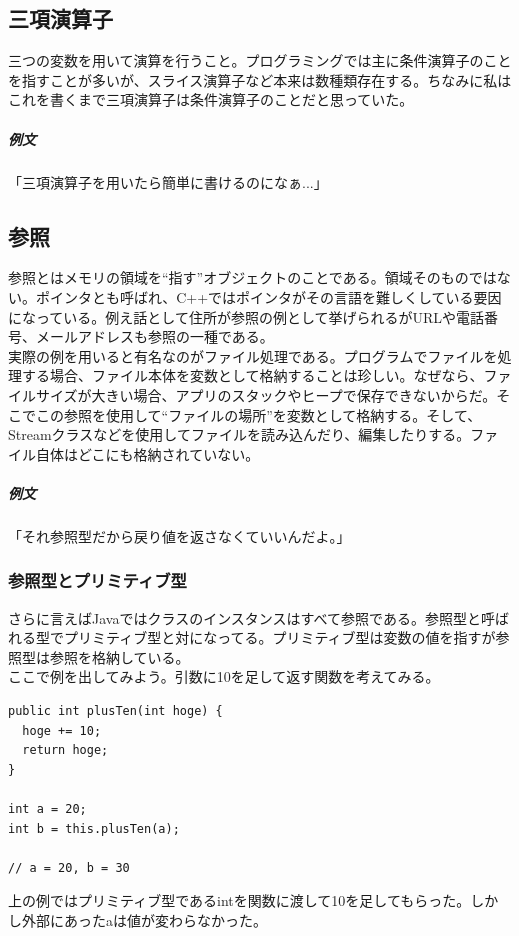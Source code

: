 \documentclass[dvipdfmx,jb5]{jreport}
\begin{document}
\subsection{三項演算子}
三つの変数を用いて演算を行うこと。プログラミングでは主に条件演算子のことを指すことが多いが、スライス演算子など本来は数種類存在する。ちなみに私はこれを書くまで三項演算子は条件演算子のことだと思っていた。

\subparagraph{例文} 「三項演算子を用いたら簡単に書けるのになぁ...」

\subsection{参照}
参照とはメモリの領域を``指す''オブジェクトのことである。領域そのものではない。ポインタとも呼ばれ、C++ではポインタがその言語を難しくしている要因になっている。例え話として住所が参照の例として挙げられるがURLや電話番号、メールアドレスも参照の一種である。
\\

実際の例を用いると有名なのがファイル処理である。プログラムでファイルを処理する場合、ファイル本体を変数として格納することは珍しい。なぜなら、ファイルサイズが大きい場合、アプリのスタックやヒープで保存できないからだ。そこでこの参照を使用して``ファイルの場所''を変数として格納する。そして、Streamクラスなどを使用してファイルを読み込んだり、編集したりする。ファイル自体はどこにも格納されていない。
\\

\subparagraph{例文} 「それ参照型だから戻り値を返さなくていいんだよ。」

\subsubsection{参照型とプリミティブ型}
さらに言えばJavaではクラスのインスタンスはすべて参照である。参照型と呼ばれる型でプリミティブ型と対になってる。プリミティブ型は変数の値を指すが参照型は参照を格納している。
\\

ここで例を出してみよう。引数に10を足して返す関数を考えてみる。
\lstset{language=Java}
\begin{lstlisting}
public int plusTen(int hoge) {
  hoge += 10;
  return hoge;
}

int a = 20;
int b = this.plusTen(a);

// a = 20, b = 30
\end{lstlisting}
上の例ではプリミティブ型であるintを関数に渡して10を足してもらった。しかし外部にあったaは値が変わらなかった。
\end{document}
